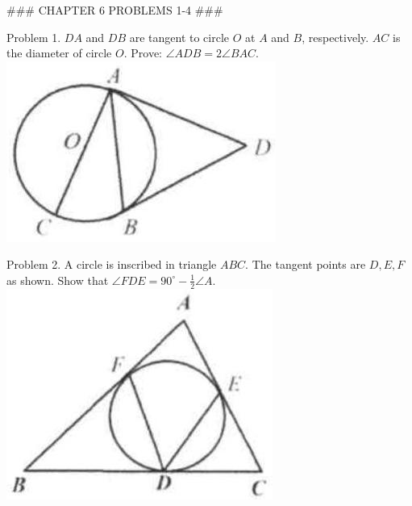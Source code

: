 \documentclass[10pt]{article}
\begin{document}
### CHAPTER 6 PROBLEMS 1-4 ###

Problem 1. \(D A\) and \(D B\) are tangent to circle \(O\) at \(A\) and \(B\), respectively. \(A C\) is the diameter of circle \(O\). Prove: \(\angle A D B=2 \angle B A C\).\\
\includegraphics[max width=\textwidth, center]{2025_04_17_97bc1f7e44d93c271a88g-206(2)}

Problem 2. A circle is inscribed in triangle \(A B C\). The tangent points are \(D, E, F\) as shown. Show that \(\angle F D E=90^{\circ}-\frac{1}{2} \angle A\).\\
\includegraphics[max width=\textwidth, center]{2025_04_17_97bc1f7e44d93c271a88g-206(3)}
\end{document}
